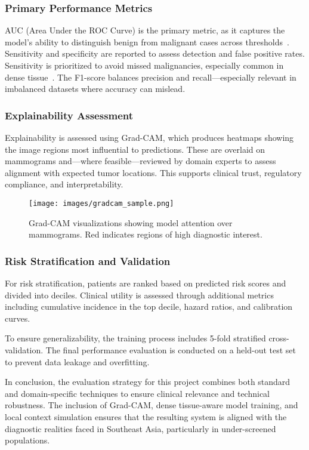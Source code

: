 \documentclass[12pt]{article}
\begin{document}
\subsubsection{Primary Performance Metrics}
AUC (Area Under the ROC Curve) is the primary metric, as it captures the model’s ability to distinguish benign from malignant cases across thresholds~\cite{1}. Sensitivity and specificity are reported to assess detection and false positive rates. Sensitivity is prioritized to avoid missed malignancies, especially common in dense tissue~\cite{6}. The F1-score balances precision and recall—especially relevant in imbalanced datasets where accuracy can mislead.

\subsubsection{Explainability Assessment}
Explainability is assessed using Grad-CAM, which produces heatmaps showing the image regions most influential to predictions. These are overlaid on mammograms and—where feasible—reviewed by domain experts to assess alignment with expected tumor locations. This supports clinical trust, regulatory compliance, and interpretability.

\begin{figure}[H]
\centering
\texttt{[image: images/gradcam\_sample.png]}
\caption{Grad-CAM visualizations showing model attention over mammograms. Red indicates regions of high diagnostic interest.}
\end{figure}

\subsubsection{Risk Stratification and Validation}
For risk stratification, patients are ranked based on predicted risk scores and divided into deciles. Clinical utility is assessed through additional metrics including cumulative incidence in the top decile, hazard ratios, and calibration curves.

To ensure generalizability, the training process includes 5-fold stratified cross-validation. The final performance evaluation is conducted on a held-out test set to prevent data leakage and overfitting.

In conclusion, the evaluation strategy for this project combines both standard and domain-specific techniques to ensure clinical relevance and technical robustness. The inclusion of Grad-CAM, dense tissue-aware model training, and local context simulation ensures that the resulting system is aligned with the diagnostic realities faced in Southeast Asia, particularly in under-screened populations.
\end{document}
